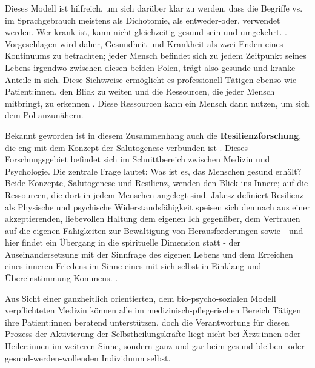 \documentclass[
  twoside,
  parskip=half-,
]{scrreprt}
\begin{document}
Dieses Modell ist hilfreich, um sich darüber klar zu werden, dass die Begriffe  vs.  im Sprachgebrauch meistens als Dichotomie, als entweder-oder, verwendet werden. Wer krank ist, kann nicht gleichzeitig gesund sein und umgekehrt. . Vorgeschlagen wird daher, Gesundheit und Krankheit als zwei Enden eines Kontinuums zu betrachten; jeder Mensch befindet sich zu jedem Zeitpunkt seines Lebens irgendwo zwischen diesen beiden Polen, trägt also gesunde und kranke Anteile in sich. Diese Sichtweise ermöglicht es professionell Tätigen ebenso wie Patient:innen, den Blick zu weiten und die Ressourcen, die jeder Mensch mitbringt, zu erkennen \autocite[17]{knuf}. Diese Ressourcen kann ein Mensch dann nutzen, um sich dem  Pol anzunähern.

Bekannt geworden ist in diesem Zusammenhang auch die \textbf{Resilienzforschung}, die eng mit dem Konzept der Salutogenese verbunden ist \autocite[vgl.][174]{integrativJakesz}. Dieses Forschungsgebiet befindet sich im Schnittbereich zwischen Medizin und Psychologie. Die zentrale Frage lautet: Was ist es, das Menschen gesund erhält? Beide Konzepte, Salutogenese und Resilienz, wenden den Blick ins Innere; auf die Ressourcen, die dort in jedem Menschen angelegt sind. Jakesz definiert Resilienz als  Physische und psychische Widerstandsfähigkeit speisen sich demnach aus einer akzeptierenden, liebevollen Haltung dem eigenen Ich gegenüber, dem Vertrauen auf die eigenen Fähigkeiten zur Bewältigung von Herausforderungen sowie - und hier findet ein Übergang in die spirituelle Dimension statt - der Auseinandersetzung mit der Sinnfrage des eigenen Lebens und dem Erreichen eines inneren Friedens im Sinne eines mit sich selbst in Einklang und Übereinstimmung Kommens. . 

Aus Sicht einer ganzheitlich orientierten, dem bio-psycho-sozialen Modell verpflichteten Medizin können alle im medizinisch-pflegerischen Bereich Tätigen ihre Patient:innen beratend unterstützen, doch die Verantwortung für diesen Prozess der Aktivierung der Selbstheilungskräfte liegt nicht bei Ärzt:innen oder Heiler:innen im weiteren Sinne, sondern ganz und gar beim gesund-bleiben- oder gesund-werden-wollenden Individuum selbst. 
\end{document}
